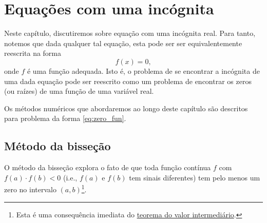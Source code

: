 
\chapter{Equações com uma incógnita}\label{cap_eq1d}
\thispagestyle{fancy}

Neste capítulo, discutiremos sobre equação com uma incógnita real. Para tanto, notemos que dada qualquer tal equação, esta pode ser ser equivalentemente reescrita na forma
\begin{equation}\label{eq:zero_fun}
  f(x) = 0,
\end{equation}
onde $f$ é uma função adequada. Isto é, o problema de se encontrar a incógnita de uma dada equação pode ser reescrito como um problema de encontrar os zeros (ou raízes) de uma função de uma variável real.

Os métodos numéricos que abordaremos ao longo deste capítulo são descritos para problema da forma \eqref{eq:zero_fun}.

\section{Método da bisseção}\label{cap_eq1d_sec_bissec}

O método da bisseção explora o fato de que toda função contínua $f$ com $f(a)\cdot f(b) < 0$ (i.e., $f(a)$ e $f(b)$ tem sinais diferentes) tem pelo menos um zero no intervalo $(a, b)$\footnote{Esta é uma consequência imediata do \href{https://phkonzen.github.io/notas/AnaliseMatematicaI/cap_continuidade_sec_prop_f_cont.html}{teorema do valor intermediário}.}.

